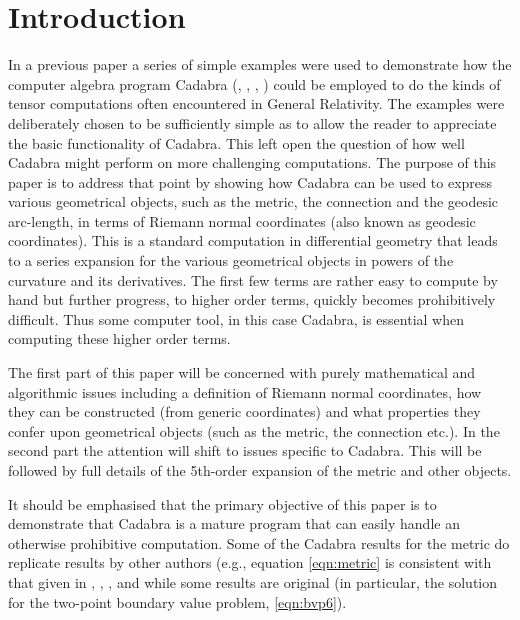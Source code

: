 \documentclass[a4paper,12pt]{article}
\numberwithin{equation}{section}
\begin{document}
\section{Introduction}

In a previous paper \cite{brewin:2009-02} a series of simple examples were used to
demonstrate how the computer algebra program Cadabra
(\cite{peeters:2007-02},
\cite{peeters:2018-01},
\cite{peeters:2017-01},
\cite{peeters:2017-02})
could be employed to do the kinds of tensor computations often encountered in General
Relativity. The examples were deliberately chosen to be sufficiently simple as to allow the
reader to appreciate the basic functionality of Cadabra. This left open the question of how
well Cadabra might perform on more challenging computations. The purpose of this paper is to
address that point by showing how Cadabra can be used to express various geometrical
objects, such as the metric, the connection and the geodesic arc-length, in terms of Riemann
normal coordinates (also known as geodesic coordinates). This is a standard computation in
differential geometry that leads to a series expansion for the various geometrical objects
in powers of the curvature and its derivatives. The first few terms are rather easy to
compute by hand but further progress, to higher order terms, quickly becomes prohibitively
difficult. Thus some computer tool, in this case Cadabra, is essential when computing these
higher order terms.

The first part of this paper will be concerned with purely mathematical and algorithmic
issues including a definition of Riemann normal coordinates, how they can be constructed
(from generic coordinates) and what properties they confer upon geometrical objects (such as
the metric, the connection etc.). In the second part the attention will shift to issues
specific to Cadabra. This will be followed by full details of the 5th-order expansion of the
metric and other objects.

It should be emphasised that the primary objective of this paper is to demonstrate that
Cadabra is a mature program that can easily handle an otherwise prohibitive computation.
Some of the Cadabra results for the metric do replicate results by other authors (e.g.,
equation \eqref{eqn:metric} is consistent with that given in
\cite{hatzinikitas:2000-01},
\cite{higashijima:2002-01},
\cite{yamashita:1984-01},
and
\cite{muller:1997-01}
while some results are original (in particular, the solution for the two-point boundary value
problem, \eqref{eqn:bvp6}).
\end{document}
